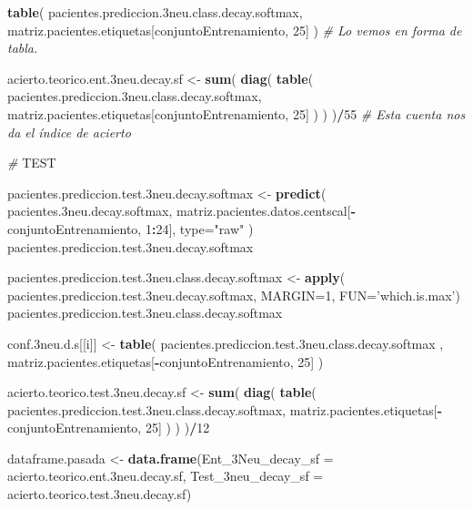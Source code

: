 \documentclass[]{article}
\newenvironment{Shaded}{\begin{snugshade}}{\end{snugshade}}
\newcommand{\AlertTok}[1]{\textcolor[rgb]{0.94,0.16,0.16}{#1}}
\newcommand{\CommentTok}[1]{\textcolor[rgb]{0.56,0.35,0.01}{\textit{#1}}}
\newcommand{\DataTypeTok}[1]{\textcolor[rgb]{0.13,0.29,0.53}{#1}}
\newcommand{\DecValTok}[1]{\textcolor[rgb]{0.00,0.00,0.81}{#1}}
\newcommand{\FloatTok}[1]{\textcolor[rgb]{0.00,0.00,0.81}{#1}}
\newcommand{\KeywordTok}[1]{\textcolor[rgb]{0.13,0.29,0.53}{\textbf{#1}}}
\newcommand{\NormalTok}[1]{#1}
\newcommand{\OperatorTok}[1]{\textcolor[rgb]{0.81,0.36,0.00}{\textbf{#1}}}
\newcommand{\StringTok}[1]{\textcolor[rgb]{0.31,0.60,0.02}{#1}}
\begin{document}
\begin{Shaded}
\begin{Highlighting}[]
  
  \KeywordTok{table}\NormalTok{( pacientes.prediccion}\FloatTok{.3}\NormalTok{neu.class.decay.softmax, matriz.pacientes.etiquetas[conjuntoEntrenamiento, }\DecValTok{25}\NormalTok{] )  }\CommentTok{# Lo vemos en forma de tabla.}
  
  
\NormalTok{  acierto.teorico.ent}\FloatTok{.3}\NormalTok{neu.decay.sf <-}\StringTok{ }\KeywordTok{sum}\NormalTok{( }\KeywordTok{diag}\NormalTok{( }\KeywordTok{table}\NormalTok{( pacientes.prediccion}\FloatTok{.3}\NormalTok{neu.class.decay.softmax, matriz.pacientes.etiquetas[conjuntoEntrenamiento, }\DecValTok{25}\NormalTok{] ) ) )}\OperatorTok{/}\DecValTok{55} \CommentTok{# Esta cuenta nos da el índice de acierto}
  
  \CommentTok{# }\AlertTok{TEST}
  
\NormalTok{  pacientes.prediccion.test}\FloatTok{.3}\NormalTok{neu.decay.softmax <-}\StringTok{ }\KeywordTok{predict}\NormalTok{( pacientes}\FloatTok{.3}\NormalTok{neu.decay.softmax, matriz.pacientes.datos.centscal[}\OperatorTok{-}\NormalTok{conjuntoEntrenamiento, }\DecValTok{1}\OperatorTok{:}\DecValTok{24}\NormalTok{], }\DataTypeTok{type=}\StringTok{"raw"}\NormalTok{ )}
\NormalTok{  pacientes.prediccion.test}\FloatTok{.3}\NormalTok{neu.decay.softmax}
  
\NormalTok{  pacientes.prediccion.test}\FloatTok{.3}\NormalTok{neu.class.decay.softmax <-}\StringTok{ }\KeywordTok{apply}\NormalTok{( pacientes.prediccion.test}\FloatTok{.3}\NormalTok{neu.decay.softmax, }\DataTypeTok{MARGIN=}\DecValTok{1}\NormalTok{, }\DataTypeTok{FUN=}\StringTok{'which.is.max'}\NormalTok{)}
\NormalTok{  pacientes.prediccion.test}\FloatTok{.3}\NormalTok{neu.class.decay.softmax}
  
\NormalTok{  conf}\FloatTok{.3}\NormalTok{neu.d.s[[i]] <-}\StringTok{ }\KeywordTok{table}\NormalTok{( pacientes.prediccion.test}\FloatTok{.3}\NormalTok{neu.class.decay.softmax , matriz.pacientes.etiquetas[}\OperatorTok{-}\NormalTok{conjuntoEntrenamiento, }\DecValTok{25}\NormalTok{] )}
  
\NormalTok{  acierto.teorico.test}\FloatTok{.3}\NormalTok{neu.decay.sf <-}\StringTok{ }\KeywordTok{sum}\NormalTok{( }\KeywordTok{diag}\NormalTok{( }\KeywordTok{table}\NormalTok{( pacientes.prediccion.test}\FloatTok{.3}\NormalTok{neu.class.decay.softmax, matriz.pacientes.etiquetas[}\OperatorTok{-}\NormalTok{conjuntoEntrenamiento, }\DecValTok{25}\NormalTok{] ) ) )}\OperatorTok{/}\DecValTok{12}
  
  
\NormalTok{  dataframe.pasada <-}\StringTok{ }\KeywordTok{data.frame}\NormalTok{(}\DataTypeTok{Ent_3Neu_decay_sf =}\NormalTok{ acierto.teorico.ent}\FloatTok{.3}\NormalTok{neu.decay.sf,}
                                 \DataTypeTok{Test_3neu_decay_sf =}\NormalTok{ acierto.teorico.test}\FloatTok{.3}\NormalTok{neu.decay.sf)}
  

\end{Highlighting}
\end{Shaded}
\end{document}
